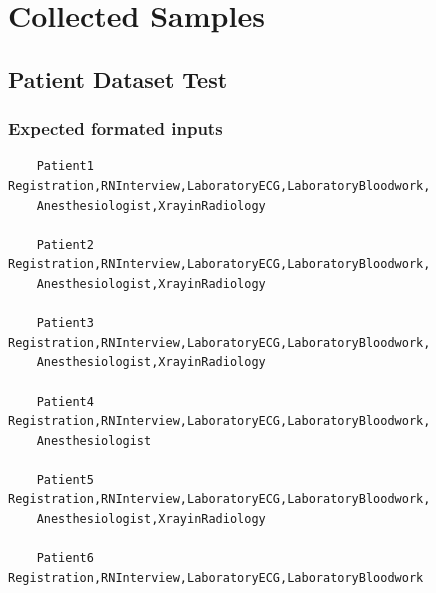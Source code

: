 \documentclass[12pt]{article}
\begin{document}


\newpage
\section{Collected Samples}
\subsection{Patient Dataset Test} \label{patientdateset}
	\subsubsection{Expected formated inputs}
	\begin{verbatim}
	Patient1 Registration,RNInterview,LaboratoryECG,LaboratoryBloodwork,
	Anesthesiologist,XrayinRadiology
	
	Patient2 Registration,RNInterview,LaboratoryECG,LaboratoryBloodwork,
	Anesthesiologist,XrayinRadiology
	
	Patient3 Registration,RNInterview,LaboratoryECG,LaboratoryBloodwork,
	Anesthesiologist,XrayinRadiology
	
	Patient4 Registration,RNInterview,LaboratoryECG,LaboratoryBloodwork,
	Anesthesiologist
	
	Patient5 Registration,RNInterview,LaboratoryECG,LaboratoryBloodwork,
	Anesthesiologist,XrayinRadiology
	
	Patient6 Registration,RNInterview,LaboratoryECG,LaboratoryBloodwork
	\end{verbatim}
\end{document}
